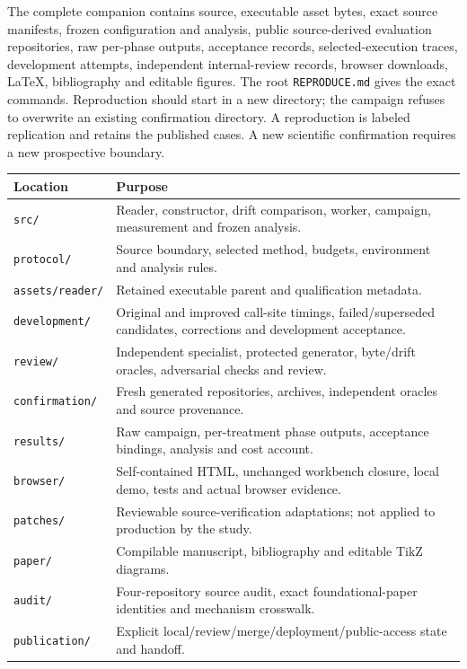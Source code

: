 \documentclass[11pt,a4paper]{article}
\newcommand{\code}[1]{\texttt{\small #1}}
\begin{document}
The complete companion contains source, executable asset bytes, exact source manifests, frozen configuration and analysis, public source-derived evaluation repositories, raw per-phase outputs, acceptance records, selected-execution traces, development attempts, independent internal-review records, browser downloads, LaTeX, bibliography and editable figures. The root \code{REPRODUCE.md} gives the exact commands. Reproduction should start in a new directory; the campaign refuses to overwrite an existing confirmation directory. A reproduction is labeled replication and retains the published cases. A new scientific confirmation requires a new prospective boundary.

\begin{longtable}{@{}p{}p{}@{}}\toprule
Location & Purpose\\\midrule\endhead
\code{src/} & Reader, constructor, drift comparison, worker, campaign, measurement and frozen analysis.\\
\code{protocol/} & Source boundary, selected method, budgets, environment and analysis rules.\\
\code{assets/reader/} & Retained executable parent and qualification metadata.\\
\code{development/} & Original and improved call-site timings, failed/superseded candidates, corrections and development acceptance.\\
\code{review/} & Independent specialist, protected generator, byte/drift oracles, adversarial checks and review.\\
\code{confirmation/} & Fresh generated repositories, archives, independent oracles and source provenance.\\
\code{results/} & Raw campaign, per-treatment phase outputs, acceptance bindings, analysis and cost account.\\
\code{browser/} & Self-contained HTML, unchanged workbench closure, local demo, tests and actual browser evidence.\\
\code{patches/} & Reviewable source-verification adaptations; not applied to production by the study.\\
\code{paper/} & Compilable manuscript, bibliography and editable TikZ diagrams.\\
\code{audit/} & Four-repository source audit, exact foundational-paper identities and mechanism crosswalk.\\
\code{publication/} & Explicit local/review/merge/deployment/public-access state and handoff.\\\bottomrule
\end{longtable}
\end{document}

